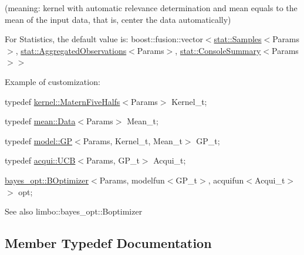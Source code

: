 (meaning\+: kernel with automatic relevance determination and mean equals to the mean of the input data, that is, center the data automatically)

For Statistics, the default value is\+: {\ttfamily boost\+::fusion\+::vector$<$\hyperlink{structlimbo_1_1stat_1_1_samples}{stat\+::\+Samples}$<$Params$>$, \hyperlink{structlimbo_1_1stat_1_1_aggregated_observations}{stat\+::\+Aggregated\+Observations}$<$Params$>$, \hyperlink{structlimbo_1_1stat_1_1_console_summary}{stat\+::\+Console\+Summary}$<$Params$>$$>$}

Example of customization\+:
\begin{DoxyItemize}
\item {\ttfamily typedef \hyperlink{structlimbo_1_1kernel_1_1_matern_five_halfs}{kernel\+::\+Matern\+Five\+Halfs}$<$Params$>$ Kernel\+\_\+t;}
\item {\ttfamily typedef \hyperlink{structlimbo_1_1mean_1_1_data}{mean\+::\+Data}$<$Params$>$ Mean\+\_\+t;}
\item {\ttfamily typedef \hyperlink{classlimbo_1_1model_1_1_g_p}{model\+::\+G\+P}$<$Params, Kernel\+\_\+t, Mean\+\_\+t$>$ G\+P\+\_\+t;}
\item {\ttfamily typedef \hyperlink{classlimbo_1_1acqui_1_1_u_c_b}{acqui\+::\+U\+C\+B}$<$Params, G\+P\+\_\+t$>$ Acqui\+\_\+t;}
\item {\ttfamily \hyperlink{classlimbo_1_1bayes__opt_1_1_b_optimizer}{bayes\+\_\+opt\+::\+B\+Optimizer}$<$Params, modelfun$<$G\+P\+\_\+t$>$, acquifun$<$Acqui\+\_\+t$>$$>$ opt;}
\end{DoxyItemize}

\begin{DoxySeeAlso}{See also}
limbo\+::bayes\+\_\+opt\+::\+Boptimizer 
\end{DoxySeeAlso}


\subsection{Member Typedef Documentation}
\hypertarget{classlimbo_1_1bayes__opt_1_1_bo_base_a02b14991b62e0f8c9bcf834220ed62e4}{}
